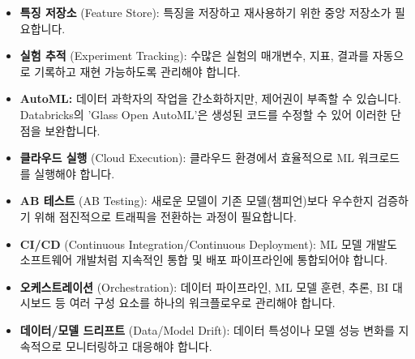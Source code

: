 \documentclass[11pt,a4paper]{article}
\theoremstyle{definition}
\begin{document}
\begin{tcolorbox}[summarybox={ML 개발의 숨겨진 복잡성}]
\begin{itemize}
    \item \textbf{특징 저장소} (Feature Store): 특징을 저장하고 재사용하기 위한 중앙 저장소가 필요합니다.
    \item \textbf{실험 추적} (Experiment Tracking): 수많은 실험의 매개변수, 지표, 결과를 자동으로 기록하고 재현 가능하도록 관리해야 합니다.
    \item \textbf{AutoML:} 데이터 과학자의 작업을 간소화하지만, 제어권이 부족할 수 있습니다. Databricks의 'Glass Open AutoML'은 생성된 코드를 수정할 수 있어 이러한 단점을 보완합니다.
    \item \textbf{클라우드 실행} (Cloud Execution): 클라우드 환경에서 효율적으로 ML 워크로드를 실행해야 합니다.
    \item \textbf{AB 테스트} (AB Testing): 새로운 모델이 기존 모델(챔피언)보다 우수한지 검증하기 위해 점진적으로 트래픽을 전환하는 과정이 필요합니다.
    \item \textbf{CI/CD} (Continuous Integration/Continuous Deployment): ML 모델 개발도 소프트웨어 개발처럼 지속적인 통합 및 배포 파이프라인에 통합되어야 합니다.
    \item \textbf{오케스트레이션} (Orchestration): 데이터 파이프라인, ML 모델 훈련, 추론, BI 대시보드 등 여러 구성 요소를 하나의 워크플로우로 관리해야 합니다.
    \item \textbf{데이터/모델 드리프트} (Data/Model Drift): 데이터 특성이나 모델 성능 변화를 지속적으로 모니터링하고 대응해야 합니다.
\end{itemize}
\end{tcolorbox}
\end{document}
